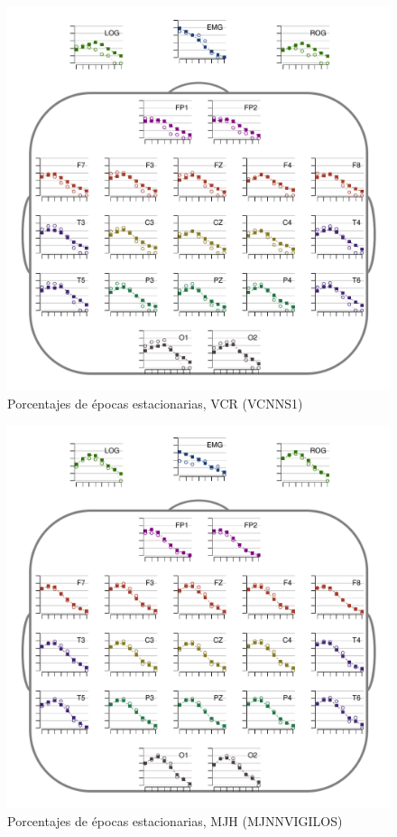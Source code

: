 \begin{figure}
\centering
\includegraphics[width=.9\linewidth]{./img_resultados/VCNNS1_cabeza_epocas_.pdf}
\caption{Porcentajes de épocas estacionarias, VCR (VCNNS1)}
\end{figure}

\begin{figure}
\centering
\includegraphics[width=.9\linewidth]{./img_resultados/MJNNVIGILOS_cabeza_epocas_.pdf}
\caption{Porcentajes de épocas estacionarias, MJH (MJNNVIGILOS)}
\end{figure}

